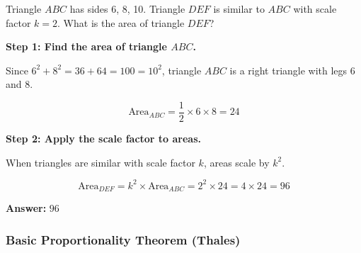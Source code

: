 ﻿\documentclass[12pt]{extarticle}
\begin{document}
Triangle $ABC$ has sides 6, 8, 10. Triangle $DEF$ is similar to $ABC$ with scale factor $k = 2$. What is the area of triangle $DEF$?

\begin{solutionbox}
\textbf{Step 1: Find the area of triangle $ABC$.}

Since $6^2 + 8^2 = 36 + 64 = 100 = 10^2$, triangle $ABC$ is a right triangle with legs 6 and 8.

\[\text{Area}_{ABC} = \frac{1}{2} \times 6 \times 8 = 24\]

\textbf{Step 2: Apply the scale factor to areas.}

When triangles are similar with scale factor $k$, areas scale by $k^2$.

\[\text{Area}_{DEF} = k^2 \times \text{Area}_{ABC} = 2^2 \times 24 = 4 \times 24 = 96\]

\textbf{Answer:} $\boxed{96}$
\end{solutionbox}

\subsubsection{Basic Proportionality Theorem (Thales)}
\end{document}
